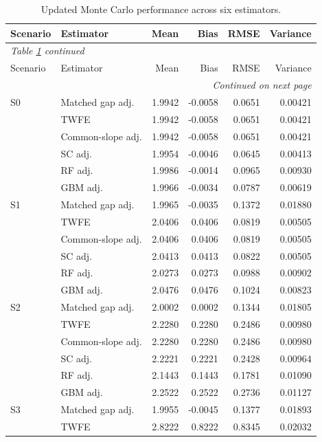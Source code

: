 \begin{longtable}{llrrrr}
\caption{Updated Monte Carlo performance across six estimators.}\label{tab:overall}\\
\toprule
Scenario & Estimator & Mean & Bias & RMSE & Variance \\
\midrule
\endfirsthead
\multicolumn{6}{l}{\textit{Table \ref{tab:overall} continued}}\\
\toprule
Scenario & Estimator & Mean & Bias & RMSE & Variance \\
\midrule
\endhead
\midrule
\multicolumn{6}{r}{\textit{Continued on next page}}\\
\endfoot
\bottomrule
\endlastfoot
S0 & Matched gap adj. & 1.9942 & -0.0058 & 0.0651 & 0.00421 \\
 & TWFE & 1.9942 & -0.0058 & 0.0651 & 0.00421 \\
 & Common-slope adj. & 1.9942 & -0.0058 & 0.0651 & 0.00421 \\
 & SC adj. & 1.9954 & -0.0046 & 0.0645 & 0.00413 \\
 & RF adj. & 1.9986 & -0.0014 & 0.0965 & 0.00930 \\
 & GBM adj. & 1.9966 & -0.0034 & 0.0787 & 0.00619 \\
\midrule
S1 & Matched gap adj. & 1.9965 & -0.0035 & 0.1372 & 0.01880 \\
 & TWFE & 2.0406 & 0.0406 & 0.0819 & 0.00505 \\
 & Common-slope adj. & 2.0406 & 0.0406 & 0.0819 & 0.00505 \\
 & SC adj. & 2.0413 & 0.0413 & 0.0822 & 0.00505 \\
 & RF adj. & 2.0273 & 0.0273 & 0.0988 & 0.00902 \\
 & GBM adj. & 2.0476 & 0.0476 & 0.1024 & 0.00823 \\
\midrule
S2 & Matched gap adj. & 2.0002 & 0.0002 & 0.1344 & 0.01805 \\
 & TWFE & 2.2280 & 0.2280 & 0.2486 & 0.00980 \\
 & Common-slope adj. & 2.2280 & 0.2280 & 0.2486 & 0.00980 \\
 & SC adj. & 2.2221 & 0.2221 & 0.2428 & 0.00964 \\
 & RF adj. & 2.1443 & 0.1443 & 0.1781 & 0.01090 \\
 & GBM adj. & 2.2522 & 0.2522 & 0.2736 & 0.01127 \\
\midrule
S3 & Matched gap adj. & 1.9955 & -0.0045 & 0.1377 & 0.01893 \\
 & TWFE & 2.8222 & 0.8222 & 0.8345 & 0.02032 \\

\end{longtable}
